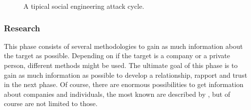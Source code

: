 \begin{figure}
  \begin{center}

    \caption{A tipical social engineering attack cycle.}
  \end{center}
\end{figure}

\subsubsection{Research}

This phase consists of several methodologies to gain as much information about
the target as possible. Depending on if the target is a company or a
private person, different methods might be used. The ultimate goal of this
phase is to gain as much information as possible to develop a relationship,
rapport and trust in the next phase. Of course, there are enormous
possibilities to get information about companies and individuals, the most
known are described by \cite{jones2004,mitnick2003,thornburgh2004}, but of
course are not limited to those.

